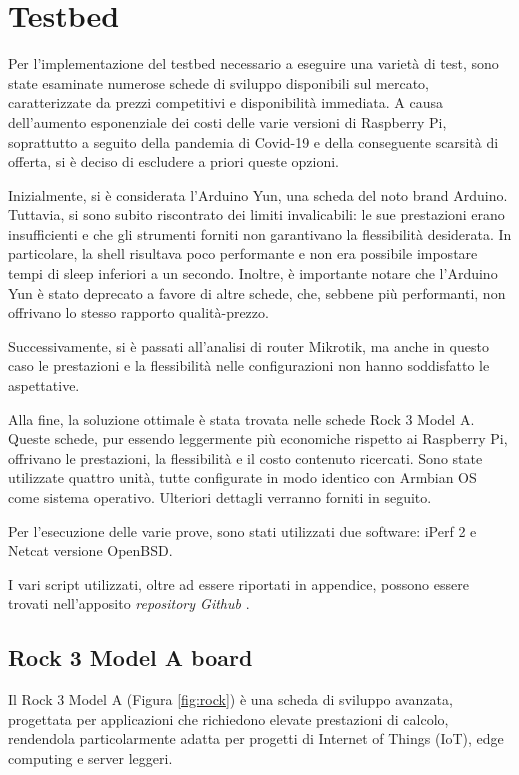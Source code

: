 \chapter{Testbed}

Per l'implementazione del testbed necessario a eseguire una varietà di test, sono state esaminate numerose schede di sviluppo disponibili sul mercato, caratterizzate da prezzi competitivi e disponibilità immediata. A causa dell'aumento esponenziale dei costi delle varie versioni di Raspberry Pi, soprattutto a seguito della pandemia di Covid-19 e della conseguente scarsità di offerta, si è deciso di escludere a priori queste opzioni.

Inizialmente, si è considerata l'Arduino Yun, una scheda del noto brand Arduino. Tuttavia, si sono subito riscontrato dei limiti invalicabili: le sue prestazioni erano insufficienti e che gli strumenti forniti non garantivano la flessibilità desiderata. In particolare, la shell risultava poco performante e non era possibile impostare tempi di sleep inferiori a un secondo. Inoltre, è importante notare che l'Arduino Yun è stato deprecato a favore di altre schede, che, sebbene più performanti, non offrivano lo stesso rapporto qualità-prezzo.

Successivamente, si è passati all'analisi di router Mikrotik, ma anche in questo caso le prestazioni e la flessibilità nelle configurazioni non hanno soddisfatto le aspettative.

Alla fine, la soluzione ottimale è stata trovata nelle schede Rock 3 Model A. Queste schede, pur essendo leggermente più economiche rispetto ai Raspberry Pi, offrivano le prestazioni, la flessibilità e il costo contenuto ricercati. Sono state utilizzate quattro unità, tutte configurate in modo identico con Armbian OS come sistema operativo. Ulteriori dettagli verranno forniti in seguito.

Per l'esecuzione delle varie prove, sono stati utilizzati due software: iPerf 2 e Netcat versione OpenBSD.

I vari script utilizzati, oltre ad essere riportati in appendice, possono essere trovati nell'apposito \textit{repository Github} \cite{DCCo802.11}.

\section{Rock 3 Model A board}

Il Rock 3 Model A (Figura \ref{fig:rock}) è una scheda di sviluppo avanzata, progettata per applicazioni che richiedono elevate prestazioni di calcolo, rendendola particolarmente adatta per progetti di Internet of Things (IoT), edge computing e server leggeri. 

